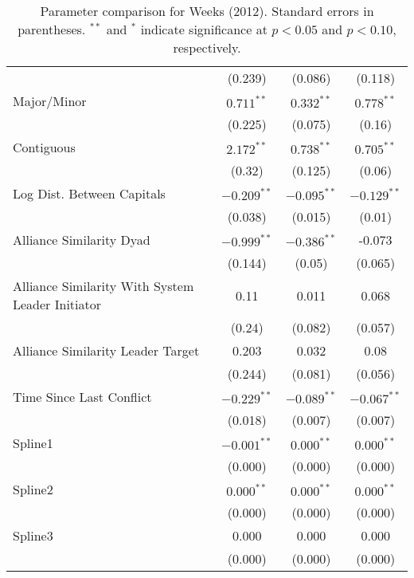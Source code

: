 \begin{table}[ht]
\begin{tabular}{lccc}
   & (0.239) & (0.086) & (0.118) \\ 
  Major/Minor & $0.711^{\ast\ast}$ & $0.332^{\ast\ast}$ & $0.778^{\ast\ast}$ \\ 
   & (0.225) & (0.075) & (0.16) \\ 
  Contiguous & $2.172^{\ast\ast}$ & $0.738^{\ast\ast}$ & $0.705^{\ast\ast}$ \\ 
   & (0.32) & (0.125) & (0.06) \\ 
  Log Dist. Between Capitals & $-0.209^{\ast\ast}$ & $-0.095^{\ast\ast}$ & $-0.129^{\ast\ast}$ \\ 
   & (0.038) & (0.015) & (0.01) \\ 
  Alliance Similarity Dyad  & $-0.999^{\ast\ast}$ & $-0.386^{\ast\ast}$ & -0.073 \\ 
   & (0.144) & (0.05) & (0.065) \\ 
  Alliance Similarity With System Leader Initiator & 0.11 & 0.011 & 0.068 \\ 
   & (0.24) & (0.082) & (0.057) \\ 
  Alliance Similarity Leader Target & 0.203 & 0.032 & 0.08 \\ 
   & (0.244) & (0.081) & (0.056) \\ 
  Time Since Last Conflict & $-0.229^{\ast\ast}$ & $-0.089^{\ast\ast}$ & $-0.067^{\ast\ast}$ \\ 
   & (0.018) & (0.007) & (0.007) \\ 
  Spline1 & $-0.001^{\ast\ast}$ & $0.000^{\ast\ast}$ & $0.000^{\ast\ast}$ \\ 
   & (0.000) & (0.000) & (0.000) \\ 
  Spline2 & $0.000^{\ast\ast}$ & $0.000^{\ast\ast}$ & $0.000^{\ast\ast}$ \\ 
   & (0.000) & (0.000) & (0.000) \\ 
  Spline3 & 0.000 & 0.000 & 0.000 \\ 
   & (0.000) & (0.000) & (0.000) \\ 
   \hline
\hline
\end{tabular}
\endgroup
\caption{Parameter comparison for Weeks (2012). Standard errors in parentheses. $^{**}$ and $^{*}$ indicate significance at $p<0.05$ and $p<0.10$, respectively.} 
\label{tab:weeks_coef}
\end{table}
